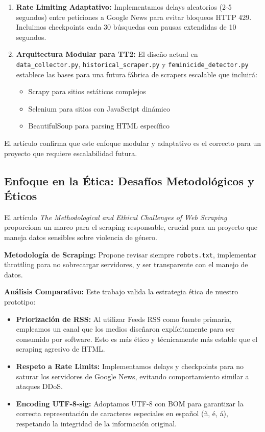 \begin{enumerate}
    \item \textbf{Rate Limiting Adaptativo:} Implementamos delays aleatorios (2-5 segundos) entre peticiones a Google News para evitar bloqueos HTTP 429. Incluimos checkpoints cada 30 búsquedas con pausas extendidas de 10 segundos.
    
    \item \textbf{Arquitectura Modular para TT2:} El diseño actual en \texttt{data\_collector.py}, \texttt{historical\_scraper.py} y \texttt{feminicide\_detector.py} establece las bases para una futura fábrica de scrapers escalable que incluirá:
    \begin{itemize}
        \item Scrapy para sitios estáticos complejos
        \item Selenium para sitios con JavaScript dinámico
        \item BeautifulSoup para parsing HTML específico
    \end{itemize}
\end{enumerate}

El artículo confirma que este enfoque modular y adaptativo es el correcto para un proyecto que requiere escalabilidad futura.

\subsection{Enfoque en la Ética: Desafíos Metodológicos y Éticos}
\label{subsec:ethical_scraping}
El artículo \textit{The Methodological and Ethical Challenges of Web Scraping} proporciona un marco para el scraping responsable, crucial para un proyecto que maneja datos sensibles sobre violencia de género.

\textbf{Metodología de Scraping:} Propone revisar siempre \texttt{robots.txt}, implementar throttling para no sobrecargar servidores, y ser transparente con el manejo de datos.

\textbf{Análisis Comparativo:} Este trabajo valida la estrategia ética de nuestro prototipo:

\begin{itemize}
    \item \textbf{Priorización de RSS:} Al utilizar Feeds RSS como fuente primaria, empleamos un canal que los medios diseñaron explícitamente para ser consumido por software. Esto es más ético y técnicamente más estable que el scraping agresivo de HTML.
    
    \item \textbf{Respeto a Rate Limits:} Implementamos delays y checkpoints para no saturar los servidores de Google News, evitando comportamiento similar a ataques DDoS.
    
    \item \textbf{Encoding UTF-8-sig:} Adoptamos UTF-8 con BOM para garantizar la correcta representación de caracteres especiales en español (ñ, é, á), respetando la integridad de la información original.
\end{itemize}

